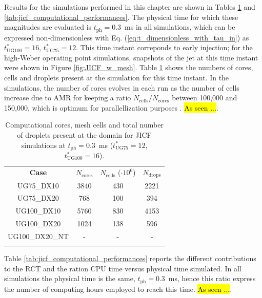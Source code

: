 Results for the simulations performed in this chapter are shown in Tables \ref{tab:jicf_Ncores_Ncells_Ndrops} and \ref{tab:jicf_computational_performances}. The physical time for which these magnitudes are evaluated is $t_\mathrm{ph} = 0.3$~ms in all simulations, which can be expressed non-dimensionless with Eq. (\ref{eq:t_dimensionless_with_tau_in}) as $t^*_{\mathrm{UG}100} = 16$, $t^*_{\mathrm{UG}75} = 12$. This time instant correponds to early injection; for the high-Weber operating point simulations, snapshots of the jet at this time instant were shown in Figure \ref{fig:JICF_w_mesh}. Table \ref{tab:jicf_Ncores_Ncells_Ndrops} shows the numbers of cores, cells and droplets present at the simulation for this time instant. In the simulations, the number of cores evolves in each run as the number of cells increase due to AMR for keeping a ratio $N_\mathrm{cells} / N_\mathrm{cores}$ between 100,000 and 150,000, which is optimum for parallellization purposes . \hl{As seen ...}. 



\begin{table}[!h]
\centering
\caption{Computational cores, mesh cells and total number of droplets present at the domain for JICF simulations at $t_\mathrm{ph} = 0.3$~ms ($t^*_{\mathrm{UG}75} = 12$, $t^*_{\mathrm{UG}100} = 16$).}
\begin{tabular}{cccc}
\thickhline
\textbf{Case} &  $N_\mathrm{cores}$ & $N_\mathrm{cells}$ ($\cdot 10^6$) & $N_\mathrm{drops}$\\
\thickhline 
UG75\_DX10 & 3840 & 430 & 2221 \\
UG75\_DX20 & 768 & 100 & 394 \\
UG100\_DX10 & 5760 & 830 & 4153 \\
UG100\_DX20 & 1024 & 138 & 596\\
UG100\_DX20\_NT & - & - & - \\
\thickhline
\end{tabular}
\label{tab:jicf_Ncores_Ncells_Ndrops}
\end{table}


Table \ref{tab:jicf_computational_performances} reports the different contributions to the RCT and the ration CPU time versus physical time simulated. In all simulations the physical time is the same, $t_\mathrm{ph} = 0.3$~ms, hence this ratio express the number of computing hours employed to reach this time. \hl{As seen ...}.

